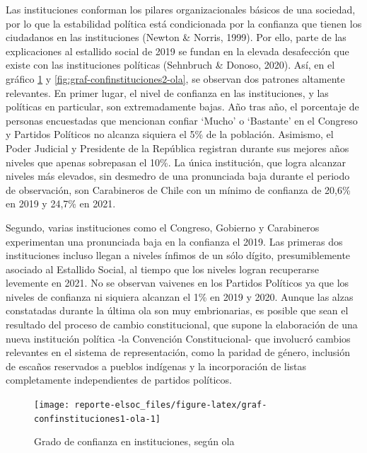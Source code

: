 \documentclass[
  12pt,
]{book}
\begin{document}
Las instituciones conforman los pilares organizacionales básicos de una sociedad, por lo que la estabilidad política está condicionada por la confianza que tienen los ciudadanos en las instituciones (Newton \& Norris, 1999). Por ello, parte de las explicaciones al estallido social de 2019 se fundan en la elevada desafección que existe con las instituciones políticas (Sehnbruch \& Donoso, 2020). Así, en el gráfico \ref{fig:graf-confinstituciones1-ola} y \ref{fig:graf-confinstituciones2-ola}, se observan dos patrones altamente relevantes. En primer lugar, el nivel de confianza en las instituciones, y las políticas en particular, son extremadamente bajas. Año tras año, el porcentaje de personas encuestadas que mencionan confiar `Mucho' o `Bastante' en el Congreso y Partidos Políticos no alcanza siquiera el 5\% de la población. Asimismo, el Poder Judicial y Presidente de la República registran durante sus mejores años niveles que apenas sobrepasan el 10\%. La única institución, que logra alcanzar niveles más elevados, sin desmedro de una pronunciada baja durante el periodo de observación, son Carabineros de Chile con un mínimo de confianza de 20,6\% en 2019 y 24,7\% en 2021.

Segundo, varias instituciones como el Congreso, Gobierno y Carabineros experimentan una pronunciada baja en la confianza el 2019. Las primeras dos instituciones incluso llegan a niveles ínfimos de un sólo dígito, presumiblemente asociado al Estallido Social, al tiempo que los niveles logran recuperarse levemente en 2021. No se observan vaivenes en los Partidos Políticos ya que los niveles de confianza ni siquiera alcanzan el 1\% en 2019 y 2020. Aunque las alzas constatadas durante la última ola son muy embrionarias, es posible que sean el resultado del proceso de cambio constitucional, que supone la elaboración de una nueva institución política -la Convención Constitucional- que involucró cambios relevantes en el sistema de representación, como la paridad de género, inclusión de escaños reservados a pueblos indígenas y la incorporación de listas completamente independientes de partidos políticos.

\begin{figure}

{\centering \texttt{[image: reporte-elsoc\_files/figure-latex/graf-confinstituciones1-ola-1]} 

}

\caption{Grado de confianza en instituciones, según ola}\label{fig:graf-confinstituciones1-ola}
\end{figure}
\end{document}
